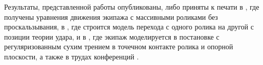 Результаты, представленной работы опубликованы, либо приняты к печати в \cite{GerasimovZobovaPMM2018}, где получены уравнения движения экипажа с массивными роликами без проскальзывания, в \cite{GerasimovZobovaTrudyMAI2018}, где строится модель перехода с одного ролика на другой с позиции теории удара, и в \cite{KosenkoGerasimovNd2016,KosenkoGerasimovJsme2016}, где экипаж моделируется в постановке с регуляризованным сухим трением в точечном контакте ролика и опорной плоскости, а также в трудах конференций \cite{Kosenko2014unilateral,KosenkoGerasimov2014,Kosenko201construction,Kosenko2015verification,Kosenko2015hierarchy,KosenkoGerasimov2015,Kosenko2016testbench,Kosenko2016ND}.


